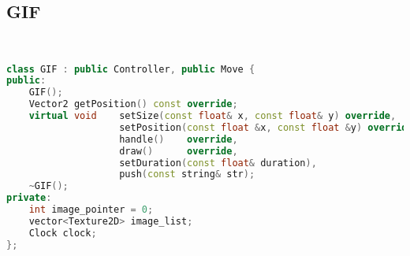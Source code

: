 \subsection{GIF}
\begin{lstlisting}[language=C++]


class GIF : public Controller, public Move {
public:
    GIF();
    Vector2 getPosition() const override;
    virtual void    setSize(const float& x, const float& y) override,
                    setPosition(const float &x, const float &y) override,
                    handle()    override,
                    draw()      override,
                    setDuration(const float& duration),
                    push(const string& str);
    ~GIF();
private:
    int image_pointer = 0;
    vector<Texture2D> image_list;
    Clock clock;
};






\end{lstlisting}
